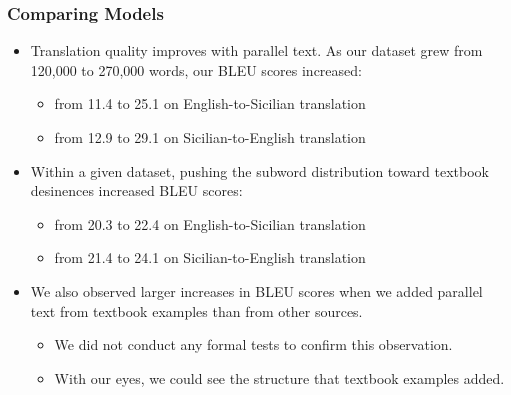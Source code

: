 \documentclass{beamer}
\begin{document}
\begin{frame}
  \frametitle{Comparing Models}
  \vspace{-1.0em}
  \begin{itemize}
  \item Translation quality improves with parallel text.  As our dataset grew
    from 120,000 to 270,000 words, our BLEU scores increased:
    \begin{itemize}
    \item from 11.4 to 25.1 on English-to-Sicilian translation
    \item from 12.9 to 29.1 on Sicilian-to-English translation
    \end{itemize}
  \vspace{0.5em}
  \item Within a given dataset, pushing the subword distribution toward textbook desinences increased BLEU scores:
    \begin{itemize}
    \item from 20.3 to 22.4 on English-to-Sicilian translation
    \item from 21.4 to 24.1 on Sicilian-to-English translation
    \end{itemize}
  \vspace{0.5em}
  \item We also observed larger increases in BLEU scores when we added parallel text from 
    textbook examples than from other sources.
    \begin{itemize}
    \item We did not conduct any formal tests to confirm this observation.
    \item With our eyes, we could see the structure that textbook examples added.
    \end{itemize}
  \end{itemize} 
\end{frame}

\end{document}
